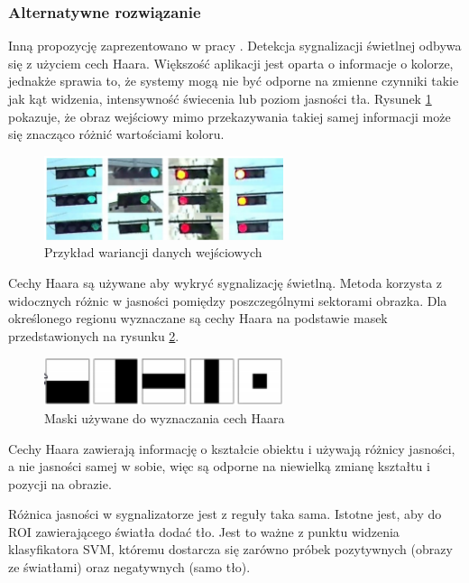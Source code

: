 
\subsubsection{Alternatywne rozwiązanie}
Inną propozycję zaprezentowano w pracy \cite{T9}. Detekcja sygnalizacji świetlnej odbywa się z użyciem cech Haara.
Większość aplikacji jest oparta o informacje o kolorze, jednakże sprawia to, że systemy mogą nie być odporne na zmienne czynniki takie jak kąt widzenia, intensywność świecenia lub poziom jasności tła.
Rysunek \ref{fig:traffic_light2_input} pokazuje, że obraz wejściowy mimo przekazywania takiej samej informacji może się znacząco różnić wartościami koloru.

\begin{figure}
  \centering
  \includegraphics[width=7cm]{img/traffic_light2_input.png}
  \caption{Przykład wariancji danych wejściowych\cite{T9}}
  \label{fig:traffic_light2_input}
\end{figure}

Cechy Haara są używane aby wykryć sygnalizację świetlną. Metoda korzysta z widocznych różnic w jasności pomiędzy poszczególnymi sektorami obrazka.
Dla określonego regionu wyznaczane są cechy Haara na podstawie masek przedstawionych na rysunku \ref{fig:maski_maseczki}.

\begin{figure}
  \centering
  \includegraphics[width=7cm]{img/maski_maseczki.png}
  \caption{Maski używane do wyznaczania cech Haara\cite{T9}}
  \label{fig:maski_maseczki}
\end{figure}

Cechy Haara zawierają informację o kształcie obiektu i używają różnicy jasności, a nie jasności samej w sobie, więc są odporne na niewielką zmianę kształtu  i pozycji na obrazie.

Różnica jasności w sygnalizatorze jest z reguły taka sama. Istotne jest, aby do ROI zawierającego światła dodać tło. Jest to ważne z punktu widzenia klasyfikatora SVM, któremu dostarcza się zarówno próbek pozytywnych (obrazy ze światłami) oraz negatywnych (samo tło).

